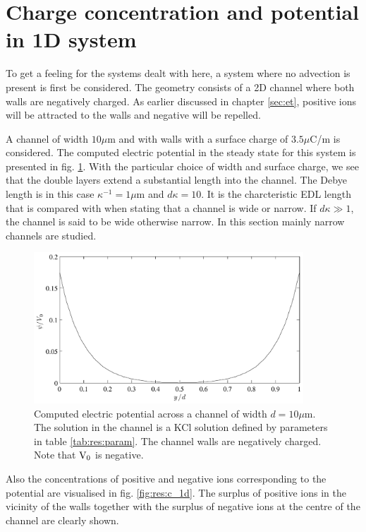 \section{Charge concentration and potential in 1D system}
To get a feeling for the systems dealt with here, a system where no
advection is present is first be considered. The geometry consists
of a 2D channel where both walls are negatively charged. As earlier
discussed in chapter \ref{sec:et}, positive ions will be attracted to
the walls and negative will be repelled.

A channel of width $10 \mu$m and with walls with a surface charge of
$3.5 \mu$C/m is considered. The computed electric potential in the
steady state for this system is presented in
fig. \ref{fig:res:pot_1d}. With the particular choice of width and
surface charge, we see that the double layers extend a substantial
length into the channel. The Debye length is in this case $\kappa^{-1} =
1 \mu$m and $d\kappa = 10$. It is the charcteristic EDL length that
is compared with when stating that a channel is wide or
narrow. If $d\kappa \gg 1$, the channel is said to be wide otherwise
narrow. In this section mainly narrow channels are studied.

\begin{figure}
\begin{center}
\includegraphics[width=0.9\textwidth]{fig/potential_1d.pdf}
\end{center}
\caption[Computed electric potential across a channel.]{Computed
  electric potential across a channel of width $d = 10 \mu$m. The
  solution in the channel is a KCl solution defined by parameters in
  table \ref{tab:res:param}. The channel walls are negatively
  charged. Note that $\mathrm{V_0}$ is negative.}
\label{fig:res:pot_1d}
\end{figure}

Also the concentrations of positive and negative ions corresponding to
the potential are visualised in fig. \ref{fig:res:c_1d}. The surplus
of positive ions in the vicinity of the walls together with the
surplus of negative ions at the centre of the channel are clearly shown. 

